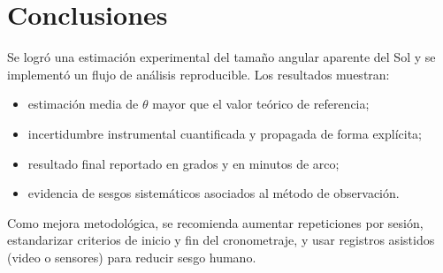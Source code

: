 \documentclass[stu,12pt,floatsintext]{apa7}
\begin{document}
\section{Conclusiones}
Se logró una estimación experimental del tamaño angular aparente del Sol y se implementó un flujo de análisis reproducible. Los resultados muestran:
\begin{itemize}
    \item estimación media de $\theta$ mayor que el valor teórico de referencia;
    \item incertidumbre instrumental cuantificada y propagada de forma explícita;
    \item resultado final reportado en grados y en minutos de arco;
    \item evidencia de sesgos sistemáticos asociados al método de observación.
\end{itemize}

Como mejora metodológica, se recomienda aumentar repeticiones por sesión, estandarizar criterios de inicio y fin del cronometraje, y usar registros asistidos (video o sensores) para reducir sesgo humano.

\printbibliography
\end{document}
